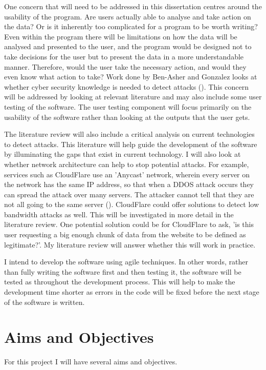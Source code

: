 One concern that will need to be addressed in this dissertation centres around the usability of the program. Are users actually able to analyse and take action on the data? Or is it inherently too complicated for a program to be worth writing? Even within the program there will be limitations on how the data will be analysed and presented to the user, and the program would be designed not to take decisions for the user but to present the data in a more understandable manner. Therefore, would the user take the necessary action, and would they even know what action to take? Work done by Ben-Asher and Gonzalez looks at whether cyber security knowledge is needed to detect attacks (\cite{ben2015effects}). This concern will be addressed by looking at relevant literature and may also include some user testing of the software. The user testing component will focus primarily on the usability of the software rather than looking at the outputs that the user gets.

The literature review will also include a critical analysis on current technologies to detect attacks. This literature will help guide the development of the software by illuminating the gaps that exist in current technology. I will also look at whether network architecture can help to stop potential attacks. For example, services such as CloudFlare use an 'Anycast' network, wherein every server on the network has the same IP address, so that when a DDOS attack occurs they can spread the attack over many servers. The attacker cannot tell that they are not all going to the same server (\cite{CloudFlare}). CloudFlare could offer solutions to detect low bandwidth attacks as well. This will be investigated in more detail in the literature review. One potential solution could be for CloudFlare to ask, 'is this user requesting a big enough chunk of data from the website to be defined as legitimate?'. My literature review will answer whether this will work in practice.

I intend to develop the software using agile techniques. In other words, rather than fully writing the software first and then testing it, the software will be tested as throughout the development process. This will help to make the development time shorter as errors in the code will be fixed before the next stage of the software is written. 

\section{Aims and Objectives}
For this project I will have several aims and objectives.
